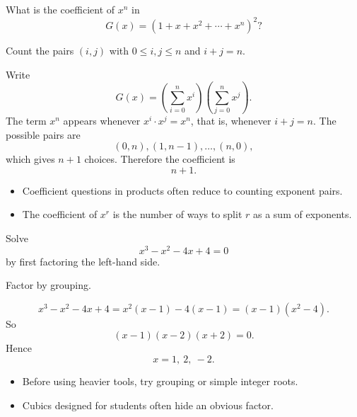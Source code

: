 \begin{problem}
What is the coefficient of $x^n$ in
\[
G(x)=\left(1+x+x^2+\cdots+x^n\right)^2?
\]
\end{problem}

\begin{hintbox}
Count the pairs $(i,j)$ with $0\le i,j\le n$ and $i+j=n$.
\end{hintbox}

\begin{solution}
Write
\[
G(x)=\left(\sum_{i=0}^{n}x^i\right)\left(\sum_{j=0}^{n}x^j\right).
\]
The term $x^n$ appears whenever $x^i\cdot x^j=x^n$, that is, whenever $i+j=n$.
The possible pairs are
\[
(0,n),(1,n-1),\ldots,(n,0),
\]
which gives $n+1$ choices. Therefore the coefficient is
\[
\boxed{n+1.}
\]
\end{solution}

\begin{takeaways}
\begin{itemize}[leftmargin=*]
\item Coefficient questions in products often reduce to counting exponent pairs.
\item The coefficient of $x^r$ is the number of ways to split $r$ as a sum of exponents.
\end{itemize}
\end{takeaways}

\begin{problem}
Solve
\[
x^3-x^2-4x+4=0
\]
by first factoring the left-hand side.
\end{problem}

\begin{hintbox}
Factor by grouping.
\end{hintbox}

\begin{solution}
\[
x^3-x^2-4x+4=x^2(x-1)-4(x-1)=(x-1)(x^2-4).
\]
So
\[
(x-1)(x-2)(x+2)=0.
\]
Hence
\[
\boxed{x=1,\ 2,\ -2.}
\]
\end{solution}

\begin{takeaways}
\begin{itemize}[leftmargin=*]
\item Before using heavier tools, try grouping or simple integer roots.
\item Cubics designed for students often hide an obvious factor.
\end{itemize}
\end{takeaways}

